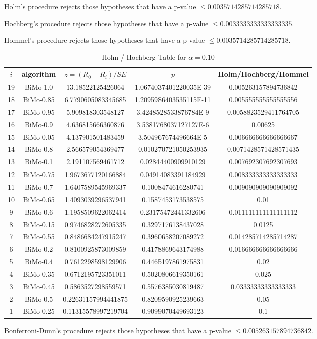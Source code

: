 \documentclass[a4paper,10pt]{article}
\begin{document}
\begin{landscape}
Holm's procedure rejects those hypotheses that have a p-value $\le0.0035714285714285718$.


Hochberg's procedure rejects those hypotheses that have a p-value $\le0.0033333333333333335$.


Hommel's procedure rejects those hypotheses that have a p-value $\le0.0035714285714285718$.


\begin{table}[!htp]
\centering\tiny
\caption{Holm / Hochberg Table for $\alpha=0.10$}
\begin{tabular}{ccccc}
$i$&algorithm&$z=(R_0 - R_i)/SE$&$p$&Holm/Hochberg/Hommel\\
\hline
19&BiMo-1.0&13.18522125426064&1.0674037401220035E-39&0.005263157894736842\\
18&BiMo-0.85&6.7790605083345685&1.2095986403535115E-11&0.005555555555555556\\
17&BiMo-0.95&5.909818303548127&3.4248528533876784E-9&0.0058823529411764705\\
16&BiMo-0.9&4.636815666360876&3.5381768037127127E-6&0.00625\\
15&BiMo-0.05&4.137901501483459&3.504967674496664E-5&0.006666666666666667\\
14&BiMo-0.8&2.566579054369477&0.010270721050253935&0.0071428571428571435\\
13&BiMo-0.1&2.191107569461712&0.02844400909910129&0.007692307692307693\\
12&BiMo-0.75&1.9673677120166884&0.04914083391184929&0.008333333333333333\\
11&BiMo-0.7&1.6407589545969337&0.1008474616280741&0.009090909090909092\\
10&BiMo-0.65&1.4093039296537941&0.1587453173538575&0.01\\
9&BiMo-0.6&1.1958509622062414&0.23175472441332606&0.011111111111111112\\
8&BiMo-0.15&0.9746828272605335&0.3297176138437028&0.0125\\
7&BiMo-0.55&0.8486684247915247&0.3960658207089272&0.014285714285714287\\
6&BiMo-0.2&0.8100925873009859&0.4178869643174988&0.016666666666666666\\
5&BiMo-0.4&0.7612298598129906&0.4465197861975831&0.02\\
4&BiMo-0.35&0.6712195723351011&0.5020806619350161&0.025\\
3&BiMo-0.45&0.5863527298559571&0.5576385030819487&0.03333333333333333\\
2&BiMo-0.5&0.22631157994441875&0.8209590925239663&0.05\\
1&BiMo-0.25&0.11315578997219704&0.9099070449693123&0.1\\
\hline
\end{tabular}
\end{table}
Bonferroni-Dunn's procedure rejects those hypotheses that have a p-value $\le0.005263157894736842$.



\end{landscape}
\end{document}
